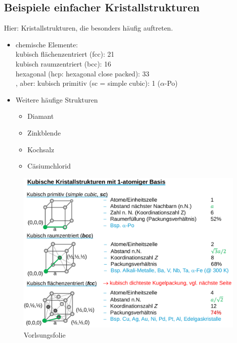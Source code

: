 \subsection{Beispiele einfacher Kristallstrukturen}
\label{kap:2_3}
Hier: Kristallstrukturen, die besonders häufig auftreten.
\begin{itemize}
    \item chemische Elemente:\\
    kubisch flächenzentriert (fcc): 21\\
    kubisch raumzentriert (bcc): 16\\
    hexagonal (hcp: hexagonal close packed): 33\\
    , aber: kubisch primitiv (sc = simple cubic): 1 ($\alpha$-Po)
    \item Weitere häufige Strukturen
    \begin{itemize}
        \item Diamant
        \item Zinkblende
        \item Kochsalz
        \item Cäsiumchlorid
    \end{itemize}
\end{itemize}
\begin{figure}[H]
    \centering
    \includegraphics[width = \textwidth]{figures/2_2Kristallstrukturen1A.png}
    \caption{Vorlsungsfolie}
    \label{}
\end{figure}
